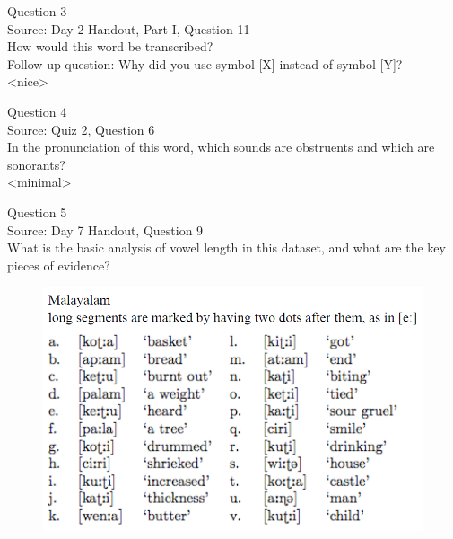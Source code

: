 \documentclass[12pt]{article}
\begin{document}
\newpage

{\large Question 3}\\

Source: Day 2 Handout, Part I, Question 11\\

How would this word be transcribed?\\ Follow-up question: Why did you use symbol [X] instead of symbol [Y]?\\

<nice>


\newpage

{\large Question 4}\\

Source: Quiz 2, Question 6\\

In the pronunciation of this word, which sounds are obstruents and which are sonorants?\\

<minimal>


\newpage

{\large Question 5}\\

Source: Day 7 Handout, Question 9\\

What is the basic analysis of vowel length in this dataset, and what are the key pieces of evidence?\\

\begin{figure}[H]
\includegraphics{../images/malayalam.png}
\end{figure}

\newpage

\begin{center}
\textbf{{\color{red}{\HUGE END OF EXAM}}}\\

\end{center}
\newpage
\end{document}
